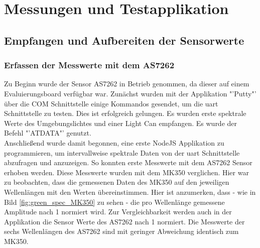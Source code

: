 \documentclass[11pt]{scrartcl}
\begin{document}
\section{Messungen und Testapplikation}
\subsection{Empfangen und Aufbereiten der Sensorwerte}
\subsubsection{Erfassen der Messwerte mit dem AS7262}
Zu Beginn wurde der Sensor AS7262 in Betrieb genommen, da dieser auf einem Evaluierungsboard verfügbar war.
Zunächst wurden mit der Applikation "'Putty"' über die COM Schnittstelle einige Kommandos gesendet, um die
\ac{uart} Schnittstelle zu testen. Dies ist erfolgreich gelungen. Es wurden erste spektrale Werte des
Umgebungslichtes und einer Light Can empfangen. Es wurde der Befehl "'ATDATA"' genutzt.\\
Anschließend wurde damit begonnen, eine erste NodeJS Applikation zu programmieren, um intervallweise spektrale Daten
von der \ac{uart} Schnittstelle abzufragen und anzuzeigen. So konnten erste Messwerte mit dem AS7262 Sensor erhoben werden.
Diese Messwerte wurden mit dem MK350 verglichen. Hier war zu beobachten, dass die gemessenen Daten des MK350 auf den jeweiligen
Wellenlängen mit den Werten übereinstimmen. Hier ist anzumerken, dass - wie in Bild \ref{fig:green_spec_MK350} zu sehen - die pro Wellenlänge
gemessene Amplitude nach 1 normiert wird. Zur Vergleichbarkeit werden auch in der Applikation die Sensor Werte des AS7262 nach
1 normiert. Die Messwerte der sechs Wellenlängen des AS7262 sind mit geringer Abweichung identisch zum MK350.\\
\end{document}
